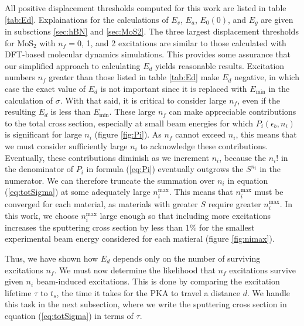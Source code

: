 \documentclass{article}
\begin{document}
All positive displacement thresholds computed for this work are listed in table
\ref{tab:Ed}.
Explainations for the calculations of $E_v$, $E_a$, $E_0(0)$, and $E_g$ are
given in subsctions \ref{sec:hBN} and \ref{sec:MoS2}.
The three largest displacement thresholds for MoS$_2$ with $n_f = 0$, 1, and 2
excitations are similar to those calculated with DFT-based molecular dynamics
simulations.\cite{Kretschmer2020}
This provides some assurance that our simplified approach to calculating $E_d$
yields reasonable results.
Excitation numbers $n_f$ greater than those listed in table \ref{tab:Ed} make
$E_d$ negative, in which case the exact value of $E_d$ is not important since
it is replaced with $E_\text{min}$ in the calculation of $\sigma$.
With that said, it is critical to consider large $n_f$, even if the resulting
$E_d$ is less than $E_\text{min}$.
These large $n_f$ can make appreciable contributions to the total
cross section, especially at small beam energies for which $P_i(\epsilon_b,
n_i)$ is significant for large $n_i$ (figure \ref{fig:Pi}).
As $n_f$ cannot exceed $n_i$, this means that we must consider sufficiently
large $n_i$ to acknowledge these contributions.
Eventually, these contributions diminish as we increment $n_i$, because the
$n_i!$ in the denominator of $P_i$ in formula (\ref{eq:Pi}) eventually
outgrows the $S^{n_i}$ in the numerator.
We can therefore truncate the summation over $n_i$ in equation
(\ref{eq:totSigma}) at some adequately large $n_i^\text{max}$.
This means that $n_i^\text{max}$ must be converged for each material, as
materials with greater $S$ require greater $n_i^\text{max}$.
In this work, we choose $n_i^\text{max}$ large enough so that including more
excitations increases the sputtering cross section by less than 1\% for the
smallest experimental beam energy considered for each matieral (figure
\ref{fig:nimax}).

Thus, we have shown how $E_d$ depends only on the number of surviving
excitations $n_f$.  We must now determine the likelihood that $n_f$ excitations
survive given $n_i$ beam-induced excitations.
This is done by comparing the excitation lifetime $\tau$ to $t_s$, the time it
takes for the PKA to travel a distance $d$.
We handle this task in the next subsection, where we write the sputtering
cross section in equation (\ref{eq:totSigma}) in terms of
$\tau$.
\end{document}
